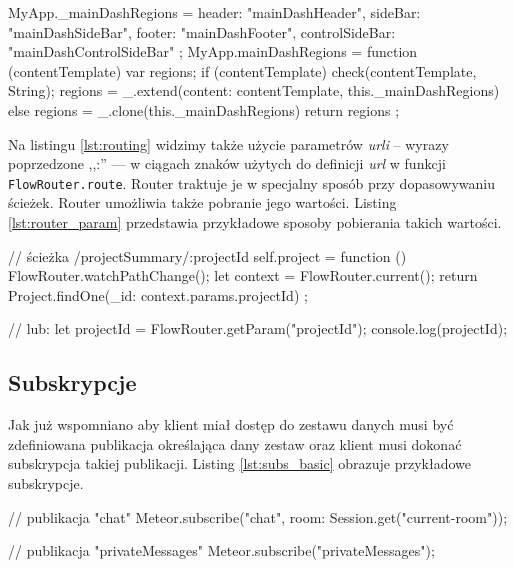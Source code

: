 \begin{js}[caption={Funkcja pomocnicza --- definicja regionów},label={lst:regions}]
MyApp._mainDashRegions = {
    header: "mainDashHeader",
    sideBar: "mainDashSideBar",
    footer: "mainDashFooter",
    controlSideBar: "mainDashControlSideBar"
};
MyApp.mainDashRegions = function (contentTemplate) {
    var regions;
    if (contentTemplate) {
        check(contentTemplate, String);
        regions = _.extend({content: contentTemplate}, this._mainDashRegions)
    } else {
        regions = _.clone(this._mainDashRegions)
    }
    return regions
};
\end{js}

Na listingu \ref{lst:routing} widzimy także użycie parametrów \textit{urli} -- wyrazy poprzedzone ,,:'' --- w ciągach znaków użytych do definicji \textit{url} w funkcji \verb|FlowRouter.route|. Router traktuje je w specjalny sposób przy dopasowywaniu ścieżek. Router umożliwia także pobranie jego wartości. Listing \ref{lst:router_param} przedstawia przykładowe sposoby pobierania takich wartości.
\begin{js}[caption={Pobieranie parametrów z routera},label={lst:router_param}]
// ścieżka /projectSummary/:projectId
self.project = function () {
    FlowRouter.watchPathChange();
    let context = FlowRouter.current();
    return Project.findOne({_id: context.params.projectId})
};

// lub:
let projectId = FlowRouter.getParam("projectId");
console.log(projectId);
\end{js}

  \subsection{Subskrypcje}
Jak już wspomniano aby klient miał dostęp do zestawu danych musi być zdefiniowana publikacja określająca dany zestaw oraz klient musi dokonać subskrypcja takiej publikacji. Listing \ref{lst:subs_basic} obrazuje przykładowe subskrypcje.
\begin{js}[caption={Podstawowe subskrypcje},label={lst:subs_basic}]
// publikacja "chat"
Meteor.subscribe("chat", {room: Session.get("current-room")});

// publikacja "privateMessages"
Meteor.subscribe("privateMessages");
\end{js}

